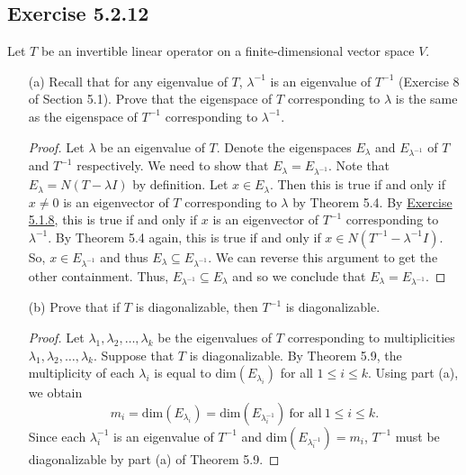 \subsection*{Exercise 5.2.12} Let \( T  \) be an invertible linear operator on a finite-dimensional vector space \( V  \). 
\begin{enumerate}
    \item[(a)] Recall that for any eigenvalue of \( T  \), \( \lambda^{-1} \) is an eigenvalue of \( T^{-1} \) (Exercise 8 of Section 5.1). Prove that the eigenspace of \( T  \) corresponding to \( \lambda  \) is the same as the eigenspace of \( T^{-1} \) corresponding to \( \lambda^{-1} \). %
        \begin{proof}
            Let \( \lambda  \) be an eigenvalue of \( T  \). Denote the eigenspaces \( {E}_{\lambda} \) and \( {E}_{\lambda^{-1}} \) of \( T  \) and \( T^{-1} \) respectively. We need to show that \( {E}_{\lambda} = {E}_{\lambda^{-1}} \). Note that \( {E}_{\lambda} = N(T - \lambda I ) \) by definition.  Let \( x \in {E}_{\lambda}  \). Then this is true if and only if \( x \neq 0    \) is an eigenvector of \( T  \) corresponding to \( \lambda \) by Theorem 5.4. By {\hyperref[Exercise 5.1.8]{Exercise 5.1.8}}, this is true if and only if \( x  \) is an eigenvector of \( T^{-1} \) corresponding to \( \lambda^{-1} \). By Theorem 5.4 again, this is true if and only if \( x \in N(T^{-1} - \lambda^{-1}I) \). So, \( x \in {E}_{\lambda^{-1}} \) and thus \( {E}_{\lambda} \subseteq {E}_{\lambda^{-1}} \). We can reverse this argument to get the other containment. Thus, \( {E}_{\lambda^{-1}} \subseteq {E}_{\lambda} \) and so we conclude that \( {E}_{\lambda} = {E}_{\lambda^{-1}} \).
        \end{proof}
    \item[(b)] Prove that if \( T  \) is diagonalizable, then \( T^{-1} \) is diagonalizable.
        \begin{proof}
        Let \( {\lambda}_{1}, {\lambda}_{2}, \dots, {\lambda}_{k} \) be the eigenvalues of \( T  \) corresponding to multiplicities \( {\lambda}_{1}, {\lambda}_{2}, \dots, {\lambda}_{k} \). Suppose that \( T  \) is diagonalizable. By Theorem 5.9, the multiplicity of each \( {\lambda}_{i} \) is equal to \( \text{dim}({E}_{{\lambda}_{i}}) \) for all \(1 \leq  i  \leq k \). Using part (a), we obtain
        \[  {m}_{i} = \text{dim}({E}_{\lambda_i}) = \text{dim}({E}_{\lambda^{-1}_{i}}) \ \text{for all} \ 1 \leq i \leq k.   \]
        Since each \( {\lambda}_{i}^{-1} \) is an eigenvalue of \( T^{-1} \) and \( \text{dim}({E}_{{\lambda}_{i}^{-1}}) = {m}_{i} \), \( T^{-1} \) must be diagonalizable by part (a) of Theorem 5.9.
        \end{proof}
\end{enumerate}

